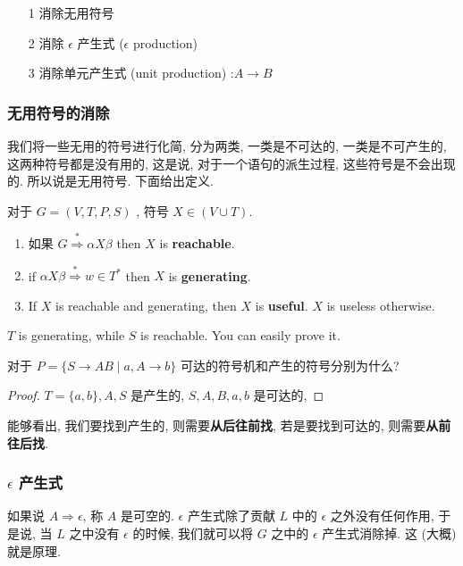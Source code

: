 \documentclass[../main_part1.tex]{subfiles}
\begin{document}
\begin{itemize}
\item [1] 
消除无用符号
\item [2] 
消除 \( \epsilon\) 产生式 (\( \epsilon\) production)
\item [3] 
消除单元产生式 (unit production) :\(A \to B\)
\end{itemize}

\subsubsection{无用符号的消除}
我们将一些无用的符号进行化简, 分为两类, 一类是不可达的, 一类是不可产生的, 这两种符号都是没有用的, 这是说, 对于一个语句的派生过程, 这些符号是不会出现的. 所以说是无用符号. 下面给出定义. 
\begin{definition}[Useful]\label{def:Useful}
对于 \(G = (V , T , P , S)\) , 符号 \(X \in (V \cup T )\). 
\begin{enumerate}
\item  如果 \(G \overset{*}{\Rightarrow}\alpha X\beta\) then \(X\) is \textbf{reachable}. 
\item  if \(\alpha X\beta \overset{*}{\Rightarrow} w \in T ^{*}\)  then \(X\) is \textbf{generating}. 
\item  If \(X\) is reachable and generating, then \(X\) is \textbf{useful}. \(X\) is useless otherwise. 
\end{enumerate}
\end{definition}
\begin{remark}
\(T\) is generating, while \(S\) is reachable. You can easily prove it.
\end{remark}

\begin{exam}
	对于 \(P =\{ S \to A B \mid a , A \to b\} \)
	可达的符号机和产生的符号分别为什么? 
\end{exam}
\begin{proof}
	\(T = \{ a, b \} , A, S\) 是产生的, \(S , A , B , a, b\) 是可达的, 
\end{proof}
\begin{remark}
能够看出, 我们要找到产生的, 则需要\textbf{从后往前找}, 若是要找到可达的, 则需要\textbf{从前往后找}. 
\end{remark}

\subsubsection{\(\epsilon\) 产生式}
如果说 \(A \Rightarrow \epsilon\), 称 \(A\) 是可空的. \( \epsilon\) 产生式除了贡献 \(L\) 中的 \( \epsilon\) 之外没有任何作用, 于是说, 当 \(L \) 之中没有 \( \epsilon\) 的时候, 我们就可以将 \(G\) 之中的 \( \epsilon\) 产生式消除掉. 这 (大概) 就是原理. 
\begin{definition}[可空变元]\label{def:可空变元}
\end{definition}
\end{document}
